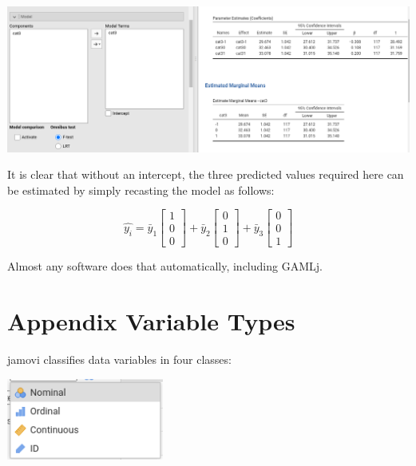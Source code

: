 \documentclass[
]{book}
\begin{document}
\includegraphics{bookletpics/ap_a_output2.png}

It is clear that without an intercept, the three predicted values required here can be estimated by simply recasting the model as follows:

\[
\hat{y_i}=\bar{y}_1 \begin{bmatrix}
1 \\
0 \\
0
\end{bmatrix} +\bar{y}_2 \begin{bmatrix}
0 \\
1 \\
0
\end{bmatrix}+
\bar{y}_3 \begin{bmatrix}
0 \\
0 \\
1
\end{bmatrix}
\]

Almost any software does that automatically, including {GAMLj}.

\hypertarget{appendixb}{%
\chapter{Appendix Variable Types}\label{appendixb}}

{jamovi} classifies data variables in four classes:

\includegraphics{bookletpics/a_vartypes.png}
\end{document}
